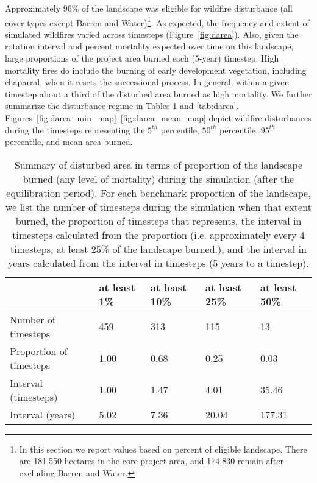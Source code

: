 Approximately 96\% of the landscape was eligible for wildfire disturbance (all cover types except Barren and Water)\footnote{In this section we report values based on percent of eligible landscape. There are 181,550 hectares in the core project area, and 174,830 remain after excluding Barren and Water.}. As expected, the frequency and extent of simulated wildfires varied across timesteps (Figure~\ref{fig:darea}). Also, given the rotation interval and percent mortality expected over time on this landscape, large proportions of the project area burned each (5-year) timestep. High mortality fires do include the burning of early development vegetation, including chaparral, when it resets the successional process. In general, within a given timestep about a third of the disturbed area burned as high mortality. We further summarize the disturbance regime in Tables \ref{tab:darea_atleast} and \ref{tab:darea}. Figures~\ref{fig:darea_min_map}--\ref{fig:darea_mean_map} depict wildfire disturbances during the timesteps representing the $5^{th}$ percentile, $50^{th}$ percentile, $95^{th}$ percentile, and mean area burned. 

\begin{table}[!htbp]
\centering
\caption{Summary of disturbed area in terms of proportion of the landscape burned (any level of mortality) during the simulation (after the equilibration period). For each benchmark proportion of the landscape, we list the number of timesteps during the simulation when that extent burned, the proportion of timesteps that represents, the interval in timesteps calculated from the proportion (i.e. approximately every 4 timesteps, at least 25\% of the landscape burned.), and the interval in years calculated from the interval in timesteps (5 years to a timestep).}
\label{tab:darea_atleast}
\begin{tabular}{@{}lllll@{}}
\toprule
                           & at least 1\%     & at least 10\%    & at least 25\%    & at least 50\% \\ \midrule
Number of timesteps        & 459              & 313              & 115              & 13            \\
Proportion of timesteps    & 1.00             & 0.68             & 0.25             & 0.03          \\
Interval (timesteps)       & 1.00             & 1.47             & 4.01             & 35.46         \\
Interval (years)           & 5.02             & 7.36             & 20.04            & 177.31        \\ \bottomrule
\end{tabular}
\end{table}

